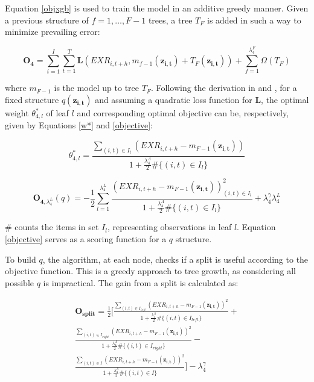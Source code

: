 \documentclass[preprint,12pt,authoryear]{elsarticle}
\begin{document}
Equation \ref{objxgb} is used to train the model in an additive greedy manner. Given a previous structure of $f = 1, \ldots, F - 1$ trees, a tree $T_{F}$ is added in such a way to minimize prevailing error: 

\begin{equation}
\mathbf{O_{4}} = \sum_{i=1}^{I}\sum_{t=1}^{T}\mathbf{L}(EXR_{i,t+h}, m_{f-1}(\mathbf{z_{i,t}}) + T_{F}(\mathbf{z_{i,t}})) + \sum_{f=1}^{\lambda^{F}_{4}}\Omega(T_{F})
\end{equation}

where $m_{F-1}$ is the model up to tree $T_{F}$. Following the derivation in \citet{coqueretguida2020} and \citet{chenguestrin2016}, for a fixed structure $q(\mathbf{z_{i,t}})$ and assuming a quadratic loss function for $\mathbf{L}$, the optimal weight $\theta^{*}_{4,l}$ of leaf $l$ and corresponding optimal objective can be, respectively, given by Equations \ref{w*} and \ref{objective}:

\begin{equation}
\label{w*}
\theta^{*}_{4,l} = \frac{\sum_{(i,t) \in I_{l}}(EXR_{i, t+h} - m_{F-1}(\mathbf{z_{i,t}}))}{1 + \frac{\lambda^{\Lambda}_{4}}{2} \#\{(i,t) \in I_{l}\}}
\end{equation}

\begin{equation}
\label{objective}
\mathbf{O}_{\mathbf{4},\lambda^{L}_{4}}(q) = -\frac{1}{2}\sum_{l=1}^{\lambda^{L}_{4}}\frac{(EXR_{i, t+h} - m_{F-1}(\mathbf{z_{i,t}}))^{2}_{(i,t) \in I_{l}}}{1 + \frac{\lambda^{\Lambda}_{4}}{2} \#\{(i,t) \in I_{l}\}} + \lambda^{\gamma}_{4}\lambda^{L}_{4}
\end{equation}

$\#$ counts the items in set $I_{l}$, representing observations in leaf $l$. Equation \ref{objective} serves as a scoring function for a $q$ structure.
 
To build $q$, the algorithm, at each node, checks if a split is useful according to the objective function. This is a greedy approach to tree growth, as considering all possible $q$ is impractical. The gain from a split is calculated as:

\begin{multline}
\mathbf{O_{split}} = \frac{1}{2}\bigg[
    \frac{\sum_{(i,t) \in I_{left}}(EXR_{i, t+h} - m_{F-1}(\mathbf{z_{i,t}}))^{2}}{1 + \frac{\lambda^{\Lambda}_{4}}{2} \#\{(i,t) \in I_{left}\}}  + \\
    \frac{\sum_{(i,t) \in I_{right}}(EXR_{i, t+h} - m_{F-1}(\mathbf{z_{i,t}}))^{2}}{1 + \frac{\lambda^{\Lambda}_{4}}{2} \#\{(i,t) \in I_{right} \}} - \\
    \frac{\sum_{(i,t) \in I}(EXR_{i, t+h} - m_{F-1}(\mathbf{z_{i,t}}))^{2}}{1 + \frac{\lambda^{\Lambda}_{4}}{2} \# \{(i,t) \in I \} } \bigg] - \lambda^{\gamma}_{4} 
\end{multline}
\end{document}
